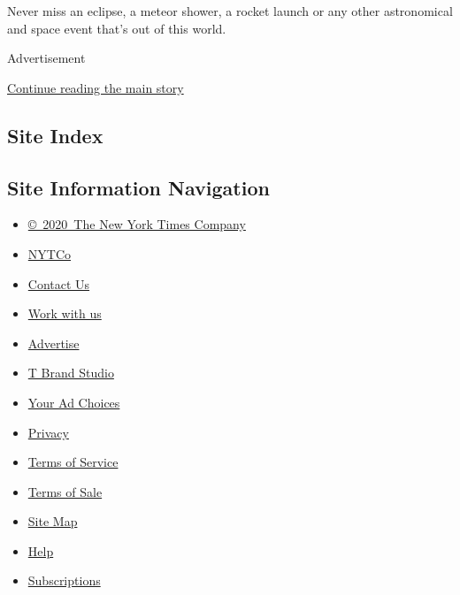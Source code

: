 Never miss an eclipse, a meteor shower, a rocket launch or any other
astronomical and space event that's out of this world.

Advertisement

\protect\hyperlink{after-bottom}{Continue reading the main story}

\hypertarget{site-index}{%
\subsection{Site Index}\label{site-index}}

\hypertarget{site-information-navigation}{%
\subsection{Site Information
Navigation}\label{site-information-navigation}}

\begin{itemize}
\tightlist
\item
  \href{https://help.nytimes3xbfgragh.onion/hc/en-us/articles/115014792127-Copyright-notice}{©~2020~The
  New York Times Company}
\end{itemize}

\begin{itemize}
\tightlist
\item
  \href{https://www.nytco.com/}{NYTCo}
\item
  \href{https://help.nytimes3xbfgragh.onion/hc/en-us/articles/115015385887-Contact-Us}{Contact
  Us}
\item
  \href{https://www.nytco.com/careers/}{Work with us}
\item
  \href{https://nytmediakit.com/}{Advertise}
\item
  \href{http://www.tbrandstudio.com/}{T Brand Studio}
\item
  \href{https://www.nytimes3xbfgragh.onion/privacy/cookie-policy\#how-do-i-manage-trackers}{Your
  Ad Choices}
\item
  \href{https://www.nytimes3xbfgragh.onion/privacy}{Privacy}
\item
  \href{https://help.nytimes3xbfgragh.onion/hc/en-us/articles/115014893428-Terms-of-service}{Terms
  of Service}
\item
  \href{https://help.nytimes3xbfgragh.onion/hc/en-us/articles/115014893968-Terms-of-sale}{Terms
  of Sale}
\item
  \href{https://spiderbites.nytimes3xbfgragh.onion}{Site Map}
\item
  \href{https://help.nytimes3xbfgragh.onion/hc/en-us}{Help}
\item
  \href{https://www.nytimes3xbfgragh.onion/subscription?campaignId=37WXW}{Subscriptions}
\end{itemize}
